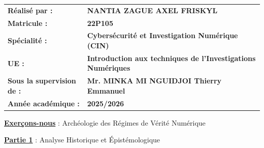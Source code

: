 \documentclass[12pt, a4paper]{article}
\newcommand{\partie}[1]{\textbf{\underline{Partie #1}}}
\newcommand{\exercice}{\textbf{\uline{Exerçons-nous}} : Archéologie des Régimes de Vérité Numérique}
\begin{document}
\begin{titlepage}
		\begin{tabular}{@{}>{\bfseries}l l@{}}
			\vspace{0.5cm}
			Réalisé par : & \textbf{NANTIA ZAGUE AXEL FRISKYL} \\
			\vspace{0.5cm}
			Matricule : & \textbf{22P105} \\
			\vspace{0.5cm}
			Spécialité : & \textbf{Cybersécurité et Investigation Numérique (CIN)} \\
			\vspace{0.5cm}
			UE : & \textbf{Introduction aux techniques de l'Investigations Numériques} \\
			\vspace{0.5cm}
			Sous la supervision de : & \textbf{Mr. MINKA MI NGUIDJOI Thierry Emmanuel} \\
			\vspace{0.5cm}
			Année académique : & \textbf{2025/2026} \\
		\end{tabular}
		
	\end{titlepage}
	
	\thispagestyle{empty}
	\newpage

	
	\exercice
	
	\partie{1} : Analyse Historique et Épistémologique
	
\end{document}
